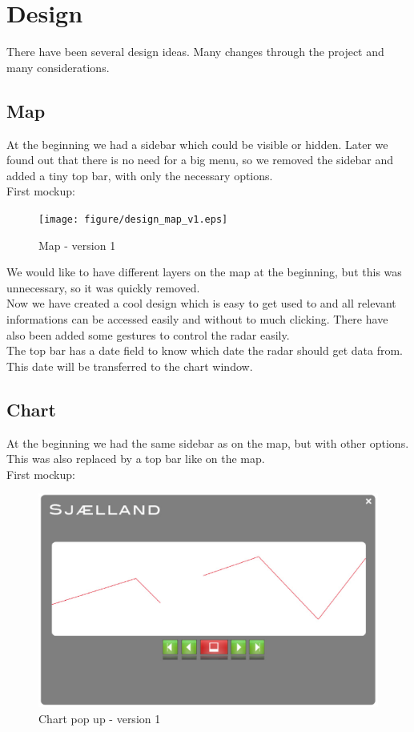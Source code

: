 \chapter{Design}
There have been several design ideas. Many changes through the project and many considerations.
\section{Map}
At the beginning we had a sidebar which could be visible or hidden. Later we found out that there is no need for a big menu, so we removed the sidebar and added a tiny top bar, with only the necessary options.\\
First mockup:
\begin{figure}[htbp]
   \centering
   \texttt{[image: figure/design\_map\_v1.eps]}
   \caption{Map - version 1}
\end{figure}

We would like to have different layers on the map at the beginning, but this was unnecessary, so it was quickly removed.\\
Now we have created a cool design which is easy to get used to and all relevant informations can be accessed easily and without to much clicking.
There have also been added some gestures to control the radar easily.\\
The top bar has a date field to know which date the radar should get data from. This date will be transferred to the chart window.

\section{Chart}
At the beginning we had the same sidebar as on the map, but with other options. This was also replaced by a top bar like on the map.\\
First mockup: 
\begin{figure}[htbp]
   \centering
   \includegraphics[scale=.3]{figure/design_chart_v1.eps}
   \caption{Chart pop up - version 1}
\end{figure}

